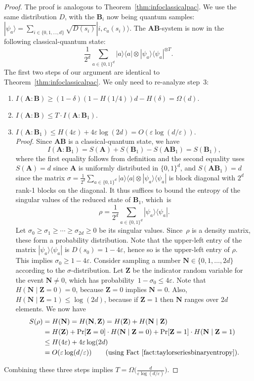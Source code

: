 \documentclass[twoside,11pt]{article}
\newcommand{\eps}{\varepsilon}
\newcommand{\ket}[1]{|#1\rangle}
\newcommand{\ketbra}[2]{|#1\rangle\! \langle #2|}
\def\01{\{0,1\}}
\begin{document}
\begin{proof}
	The proof is analogous to Theorem~\ref{thm:infoclassicalpac}.
	We use the same distribution $D$, with the $\mathbf{B}_i$ now being quantum samples: $\ket{\psi_a}=\sum_{i\in\{0,1,\ldots,d\}}\sqrt{D(s_i)}\ket{i,c_a(s_i)}$. 
	The $\mathbf{A}\mathbf{B}$-system is now in the following classical-quantum state:
	$$
	\frac{1}{2^d}\sum_{a\in\01^d} \ketbra{a}{a}\otimes \ketbra{\psi_a}{\psi_a}^{\otimes T}.
	$$
	The first two steps of our argument are identical to Theorem~\ref{thm:infoclassicalpac}. We only need to re-analyze step~3:
	\begin{enumerate}
		\item $I(\mathbf{A}:\mathbf{B})\geq (1-\delta)(1-H(1/4))d - H(\delta)=\Omega(d)$.
		\item $I(\mathbf{A}:\mathbf{B})\leq T\cdot I(\mathbf{A}:\mathbf{B}_1)$.
		\item $I(\mathbf{A}:\mathbf{B}_1)\leq H(4\eps) + 4\eps\log(2d)=O(\eps\log(d/\eps))$.\\[2mm]
		\emph{Proof.} Since $\mathbf{A}\mathbf{B}$ is a classical-quantum state, we have 
		$$
		I(\mathbf{A}:\mathbf{B}_1)= S(\mathbf{A})+S(\mathbf{B}_1)-S(\mathbf{A}\mathbf{B}_1)=S(\mathbf{B}_1),
		$$ 
		where the first equality follows from definition and the second equality uses $S(\mathbf{A})=d$ since $\mathbf{A}$ is uniformly distributed in $\01^d$, and $S(\mathbf{A}\mathbf{B}_1)=d$ since the matrix $\sigma=\frac{1}{2^d} \sum_{a\in \01^d} \ketbra{a}{a}\otimes \ketbra{\psi_a}{\psi_a}$ is block diagonal with $2^d$ rank-1 blocks on the diagonal. It thus suffices to bound the entropy of the singular values of the reduced state of $\mathbf{B}_1$, which~is
		$$
		\rho=\frac{1}{2^d}\sum_{a\in\01^d}\ketbra{\psi_a}{\psi_a}.
		$$
		Let $\sigma_0\geq \sigma_1\geq\cdots\geq \sigma_{2d}\geq 0$ be its singular values. Since~$\rho$ is a density matrix, these form a probability distribution. Note that the upper-left entry of the matrix $\ketbra{\psi_a}{\psi_a}$ is $D(s_0)=1-4\eps$, hence so is the upper-left entry of $\rho$. This implies $\sigma_0\geq 1-4\eps$. Consider sampling a number $\mathbf{N}\in\{0,1,\ldots,2d\}$ according to the $\sigma$-distribution. Let $\mathbf{Z}$ be the indicator random variable for the event $\mathbf{N}\neq 0$, which has probability~$1-\sigma_0\leq 4\eps$. Note that $H(\mathbf{N}\mid\mathbf{Z}=0)=0$, because $\mathbf{Z}=0$ implies $\mathbf{N}=0$. Also, $H(\mathbf{N}\mid\mathbf{Z}=1)\leq\log(2d)$, because if $\mathbf{Z}=1$ then $\mathbf{N}$ ranges over $2d$ elements.
		We now have 
		\begin{align*}
		S(\rho) & =H(\mathbf{N})=H(\mathbf{N},\mathbf{Z})=H(\mathbf{Z})+H(\mathbf{N}\mid\mathbf{Z})\\
		& = H(\mathbf{Z}) + \Pr[\mathbf{Z}=0]\cdot H(\mathbf{N}\mid\mathbf{Z}=0) + \Pr[\mathbf{Z}=1]\cdot H(\mathbf{N}\mid\mathbf{Z}=1)\\
		& \leq H(4\eps) + 4\eps\log(2d)\\
		& = O(\eps\log(d/\eps)) \tag{using Fact~\ref{fact:taylorseriesbinaryentropy}}.
		\end{align*}
	\end{enumerate}
	Combining these three steps implies $T=\Omega\Big(\frac{d}{\eps\log(d/\eps)}\Big)$.
\end{proof}
\end{document}
